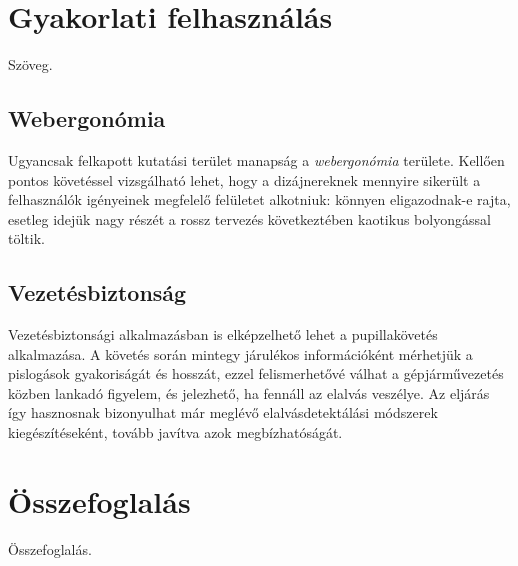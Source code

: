 \section{Gyakorlati felhasználás}\label{sect:gyakorlati}

Szöveg.

\subsection{Webergonómia}\label{sect:webergonomia}

Ugyancsak felkapott kutatási terület manapság a \emph{webergonómia} területe. Kellően pontos követéssel vizsgálható lehet, hogy a dizájnereknek mennyire sikerült a felhasználók igényeinek megfelelő felületet alkotniuk: könnyen eligazodnak-e rajta, esetleg idejük nagy részét a rossz tervezés következtében kaotikus bolyongással töltik.

\subsection{Vezetésbiztonság}\label{sect:orvosi_felhasznalas}

Vezetésbiztonsági alkalmazásban is elképzelhető lehet a pupillakövetés alkalmazása. A követés során mintegy járulékos információként mérhetjük a pislogások gyakoriságát és hosszát, ezzel felismerhetővé válhat a gépjárművezetés közben lankadó figyelem, és jelezhető, ha fennáll az elalvás veszélye. Az eljárás így hasznosnak bizonyulhat már meglévő elalvásdetektálási módszerek \cite{sleepdet} kiegészítéseként, tovább javítva azok megbízhatóságát.

\section{Összefoglalás}\label{sect:felh_osszefoglalas}

Összefoglalás.